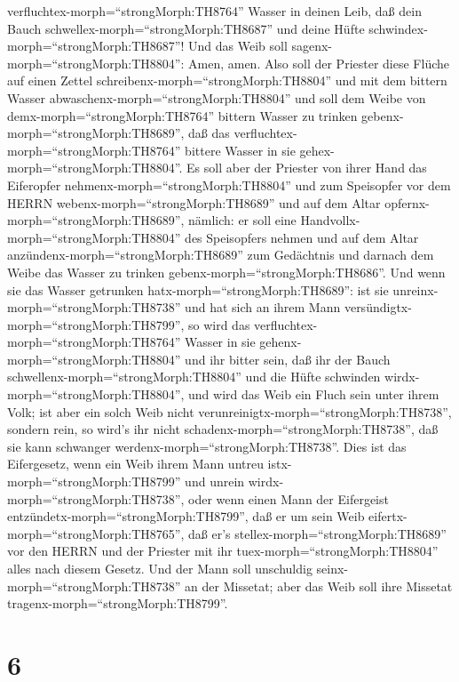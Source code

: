 verfluchtex-morph=``strongMorph:TH8764'' Wasser in deinen Leib, daß dein
Bauch schwellex-morph=``strongMorph:TH8687'' und deine Hüfte
schwindex-morph=``strongMorph:TH8687''! Und das Weib soll
sagenx-morph=``strongMorph:TH8804'': Amen, amen.  Also soll
der Priester diese Flüche auf einen Zettel
schreibenx-morph=``strongMorph:TH8804'' und mit dem bittern Wasser
abwaschenx-morph=``strongMorph:TH8804''  und soll dem Weibe
von demx-morph=``strongMorph:TH8764'' bittern Wasser zu trinken
gebenx-morph=``strongMorph:TH8689'', daß das
verfluchtex-morph=``strongMorph:TH8764'' bittere Wasser in sie
gehex-morph=``strongMorph:TH8804''.  Es soll aber der
Priester von ihrer Hand das Eiferopfer
nehmenx-morph=``strongMorph:TH8804'' und zum Speisopfer vor dem HERRN
webenx-morph=``strongMorph:TH8689'' und auf dem Altar
opfernx-morph=``strongMorph:TH8689'', nämlich:  er soll
eine Handvollx-morph=``strongMorph:TH8804'' des Speisopfers nehmen und
auf dem Altar anzündenx-morph=``strongMorph:TH8689'' zum Gedächtnis und
darnach dem Weibe das Wasser zu trinken
gebenx-morph=``strongMorph:TH8686''.  Und wenn sie das
Wasser getrunken hatx-morph=``strongMorph:TH8689'': ist sie
unreinx-morph=``strongMorph:TH8738'' und hat sich an ihrem Mann
versündigtx-morph=``strongMorph:TH8799'', so wird das
verfluchtex-morph=``strongMorph:TH8764'' Wasser in sie
gehenx-morph=``strongMorph:TH8804'' und ihr bitter sein, daß ihr der
Bauch schwellenx-morph=``strongMorph:TH8804'' und die Hüfte schwinden
wirdx-morph=``strongMorph:TH8804'', und wird das Weib ein Fluch sein
unter ihrem Volk;  ist aber ein solch Weib nicht
verunreinigtx-morph=``strongMorph:TH8738'', sondern rein, so wird's ihr
nicht schadenx-morph=``strongMorph:TH8738'', daß sie kann schwanger
werdenx-morph=``strongMorph:TH8738''.  Dies ist das
Eifergesetz, wenn ein Weib ihrem Mann untreu
istx-morph=``strongMorph:TH8799'' und unrein
wirdx-morph=``strongMorph:TH8738'',  oder wenn einen Mann
der Eifergeist entzündetx-morph=``strongMorph:TH8799'', daß er um sein
Weib eifertx-morph=``strongMorph:TH8765'', daß er's
stellex-morph=``strongMorph:TH8689'' vor den HERRN und der Priester mit
ihr tuex-morph=``strongMorph:TH8804'' alles nach diesem Gesetz.
 Und der Mann soll unschuldig
seinx-morph=``strongMorph:TH8738'' an der Missetat; aber das Weib soll
ihre Missetat tragenx-morph=``strongMorph:TH8799''.

\hypertarget{section-5}{%
\section{6}\label{section-5}}

